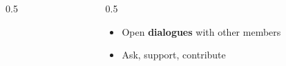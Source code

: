 \begin{frame}
\begin{center}
\begin{columns}[T]
\begin{column}{0.5\textwidth}
{{\begin{itemize}
                        \end{itemize}
                        }
                    }
            \end{column}
            \hfill
            \begin{column}{0.5\textwidth}
                    {
                        {\setlength{\leftmargini}{1.0em}
                        \begin{itemize}
                            \item Open \textbf{dialogues} with other members
                            \item Ask, support, contribute
                        \end{itemize}
                        }
                    }
            \end{column}
        \end{columns}
    \end{center}
\end{frame}


